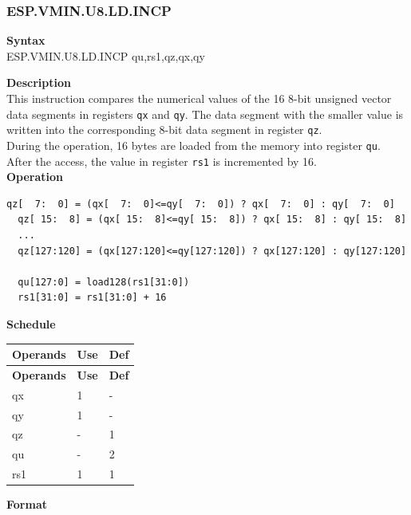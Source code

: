\newpage
\subsubsection{ESP.VMIN.U8.LD.INCP}\label{instruction:ESPVMINU8LDINCP}
\textbf{Syntax}\\
ESP.VMIN.U8.LD.INCP qu,rs1,qz,qx,qy

\textbf{Description}\\
This instruction compares the numerical values of the 16 8-bit unsigned vector data segments in registers \lstinline{qx} and \lstinline{qy}. The data segment with the smaller value is written into the corresponding 8-bit data segment in register \lstinline{qz}.\\During the operation, 16 bytes are loaded from the memory into register \lstinline{qu}. After the access, the value in register \lstinline{rs1} is incremented by 16.\\
\textbf{Operation}
\begin{lstlisting}[escapeinside=`?]
  qz[  7:  0] = (qx[  7:  0]<=qy[  7:  0]) ? qx[  7:  0] : qy[  7:  0]
  qz[ 15:  8] = (qx[ 15:  8]<=qy[ 15:  8]) ? qx[ 15:  8] : qy[ 15:  8]
  ...
  qz[127:120] = (qx[127:120]<=qy[127:120]) ? qx[127:120] : qy[127:120]

  qu[127:0] = load128(rs1[31:0])
  rs1[31:0] = rs1[31:0] + 16
\end{lstlisting}


\textbf{Schedule}\\
\begin{longtable}[c]{|l|l|l|}
    \hline
    \rowcolor{lightgray}
    \textbf{Operands} & \textbf{Use} & \textbf{Def} \\\hline
    \endfirsthead
    \hline
    \rowcolor{lightgray}
     \textbf{Operands} & \textbf{Use} & \textbf{Def} \\\hline
    \endhead
    \hline
    \endfoot

    qx & 1 & - \\\hline
  qy & 1 & - \\\hline
     qz & - & 1 \\\hline
     qu & - & 2 \\\hline
     rs1 & 1 & 1

\end{longtable}

\textbf{Format}\\

